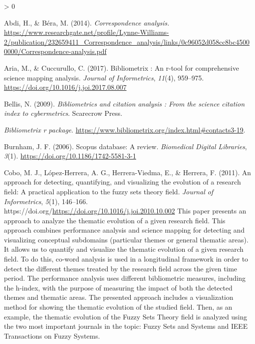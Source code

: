 \documentclass[
]{article}
\newlength{\cslhangindent}
\newenvironment{CSLReferences}[2] %
 {%
  \setlength{\parindent}{0pt}
  \ifodd #1 \everypar{\setlength{\hangindent}{\cslhangindent}}\ignorespaces\fi
  \ifnum #2 > 0
  \setlength{\parskip}{#2\baselineskip}
  \fi
 }%
 {}
\newcommand{\CSLBlock}[1]{#1\hfill\break}
\begin{document}
\hypertarget{refs}{}
\begin{CSLReferences}{1}{0}
\leavevmode\hypertarget{ref-Abdi2014}{}%
Abdi, H., \& Béra, M. (2014). \emph{Correspondence analysis.}
\url{https://www.researchgate.net/profile/Lynne-Williams-2/publication/232659411_Correspondence_analysis/links/0c96052d058cc8bc45000000/Correspondence-analysis.pdf}

\leavevmode\hypertarget{ref-Aria2017}{}%
Aria, M., \& Cuccurullo, C. (2017). Bibliometrix : An r-tool for
comprehensive science mapping analysis. \emph{Journal of Informetrics},
\emph{11}(4), 959--975. \url{https://doi.org/10.1016/j.joi.2017.08.007}

\leavevmode\hypertarget{ref-Nicola2009}{}%
Bellis, N. (2009). \emph{Bibliometrics and citation analysis : From the
science citation index to cybermetrics}. Scarecrow Press.

\leavevmode\hypertarget{ref-bibrpack}{}%
\emph{Bibliometrix r package}.
\url{https://www.bibliometrix.org/index.html\#contacts3-19}.

\leavevmode\hypertarget{ref-Burnham2006}{}%
Burnham, J. F. (2006). Scopus database: A review. \emph{Biomedical
Digital Libraries}, \emph{3}(1).
\url{https://doi.org/10.1186/1742-5581-3-1}

\leavevmode\hypertarget{ref-Cobo2011}{}%
Cobo, M. J., López-Herrera, A. G., Herrera-Viedma, E., \& Herrera, F.
(2011). An approach for detecting, quantifying, and visualizing the
evolution of a research field: A practical application to the fuzzy sets
theory field. \emph{Journal of Informetrics}, \emph{5}(1), 146--166.
https://doi.org/\url{https://doi.org/10.1016/j.joi.2010.10.002}
\CSLBlock{This paper presents an approach to analyze the thematic
evolution of a given research field. This approach combines performance
analysis and science mapping for detecting and visualizing conceptual
subdomains (particular themes or general thematic areas). It allows us
to quantify and visualize the thematic evolution of a given research
field. To do this, co-word analysis is used in a longitudinal framework
in order to detect the different themes treated by the research field
across the given time period. The performance analysis uses different
bibliometric measures, including the h-index, with the purpose of
measuring the impact of both the detected themes and thematic areas. The
presented approach includes a visualization method for showing the
thematic evolution of the studied field. Then, as an example, the
thematic evolution of the Fuzzy Sets Theory field is analyzed using the
two most important journals in the topic: Fuzzy Sets and Systems and
IEEE Transactions on Fuzzy Systems.}


\end{CSLReferences}
\end{document}
